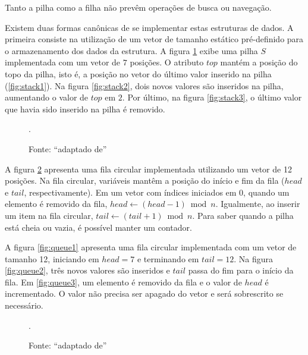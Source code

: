 Tanto a pilha como a filha não prevêm operações de busca ou navegação.

Existem duas formas canônicas de se implementar estas estruturas de dados. A primeira consiste na utilização de um vetor de tamanho estático pré-definido para o armazenamento dos dados da estrutura. A figura \ref{fig:stack} exibe uma pilha \(S\) implementada com um vetor de \(7\) posições. O atributo \(top\) mantém a posição do topo da pilha, isto é, a posição no vetor do último valor inserido na pilha (\ref{fig:stack1}). Na figura \ref{fig:stack2}, dois novos valores são inseridos na pilha, aumentando o valor de \(top\) em \(2\). Por último, na figura \ref{fig:stack3}, o último valor que havia sido inserido na pilha é removido.

\begin{figure}
  \centering


  \caption{Fonte: ``adaptado de'' \cite{cormen_introduction_2009}}.\label{fig:stack}
\end{figure}

A figura \ref{fig:queue} apresenta uma fila circular \cite{cormen_introduction_2009} implementada utilizando um vetor de 12 posições. Na fila circular, variáveis mantêm a posição do início e fim da fila (\(head\) e \(tail\), respectivamente). Em um vetor com índices iniciados em 0, quando um elemento é removido da fila, \(head \leftarrow (head - 1) \bmod n\). Igualmente, ao inserir um item na fila circular, \(tail \leftarrow (tail + 1) \bmod n\). Para saber quando a pilha está cheia ou vazia, é possível manter um contador.

A figura \ref{fig:queue1} apresenta uma fila circular implementada com um vetor de tamanho 12, iniciando em \(head = 7\) e terminando em \(tail = 12\). Na figura \ref{fig:queue2}, três novos valores são inseridos e \(tail\) passa do fim para o início da fila. Em \ref{fig:queue3}, um elemento é removido da fila e o valor de \(head\) é incrementado. O valor não precisa ser apagado do vetor e será sobrescrito se necessário.

\begin{figure}
  \centering


  \caption{Fonte: ``adaptado de'' \cite{cormen_introduction_2009}}.\label{fig:queue}
\end{figure}

